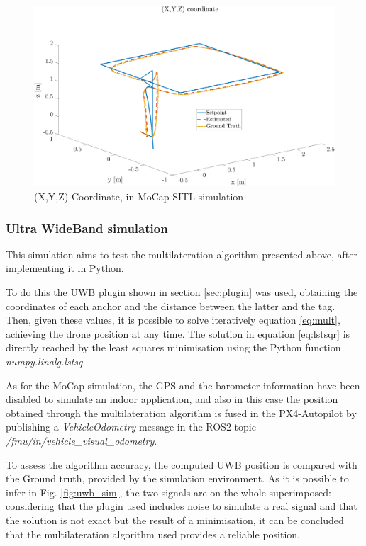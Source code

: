 \documentclass[journal]{IEEEtran}
\begin{document}
\begin{figure}
    \centering
    \includegraphics[scale=0.20]{Images/SITL_MOCAP/xyz_sitl_mocap.png}
    \caption{(X,Y,Z) Coordinate, in MoCap SITL simulation}
    \label{fig:SITL_MOCAP}
\end{figure}

\subsubsection{Ultra WideBand simulation}

This simulation aims to test the multilateration algorithm presented above, after implementing it in Python. 

To do this the UWB plugin shown in section \ref{sec:plugin} was used, obtaining the coordinates of each anchor and the distance between the latter and the tag. Then, given these values, it is possible to solve iteratively equation \ref{eq:mult}, achieving the drone position at any time. The solution in equation \ref{eq:lstsqr} is directly reached by the least squares minimisation using the Python function \textit{numpy.linalg.lstsq}.

As for the MoCap simulation, the GPS and the barometer information have been disabled to simulate an indoor application, and also in this case the position obtained through the multilateration algorithm is fused in the PX4-Autopilot by publishing a \textit{VehicleOdometry} message in the ROS2 topic \textit{/fmu/in/vehicle\_visual\_odometry}. 

To assess the algorithm accuracy, the computed UWB position is compared with the Ground truth, provided by the simulation environment. As it is possible to infer in Fig. \ref{fig:uwb_sim}, the two signals are on the whole superimposed: considering that the plugin used includes noise to simulate a real signal and that the solution is not exact but the result of a minimisation, it can be concluded that the multilateration algorithm used provides a reliable position. 
\end{document}
